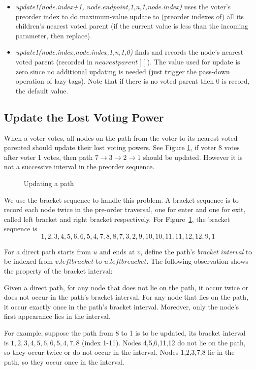 \begin{itemize}
	\item {\em update1(node.index+1, node.endpoint,1,n,1,node.index)} uses the voter's preorder index to do maximum-value update to (preorder indexes of) all its children's nearest voted parent (if the current value is less than the incoming parameter, then replace). 
	\item {\em update1(node.index,node.index,1,n,1,0)} finds and records the node's nearest voted parent (recorded in $nearestparent[]$). The value used for update is zero since no additional updating is needed (just trigger the pass-down operation of lazy-tags). Note that if there is no voted parent then 0 is record, the default value. 
\end{itemize}

\subsection{Update the Lost Voting Power}
\label{sec:step3}
When a voter votes, all nodes on the path from the voter to its nearest voted parented should update their lost voting powers. See Figure \ref{fig:2}, if voter 8 votes after voter 1 votes, then path $7\rightarrow3\rightarrow2\rightarrow1$ should be updated. However it is not a successive interval in the preorder sequence.
\begin{figure}
  \centering
  
	\caption{Updating a path}
	\label{fig:2}
\end{figure}

We use the bracket sequence to handle this problem. A bracket sequence is to
record each node twice in the pre-order traversal, one for enter and one for
exit, called left bracket and right bracket respectively. For Figure~\ref{fig:2}, the bracket sequence is
$$1,2,3,4,5,6,6,5,4,7,8,8,7,3,2,9,10,10,11,11,12,12,9,1$$

For a direct path starts from $u$ and ends at $v$, define the path's {\em bracket interval} to be indexed from $v.leftbracket$ to $u.leftbreacket$. The following observation shows the property of the bracket interval:
\begin{observation}
Given a direct path, for any node that does not lie on the path, it occur twice or does not occur in the path's bracket interval. For any node that lies on the path, it occur exactly once in the path's bracket interval. Moreover, only the node’s first appearance lies in the interval.
\end{observation}
For example, suppose the path from 8 to 1 is to be updated, its bracket interval is $1,2,3,4,5,6,6,5,4,7,8$ (index 1-11). Nodes 4,5,6,11,12 do not lie on the path, so they occur twice or do not occur in the interval. Nodes 1,2,3,7,8 lie in the path, so they occur once in the interval. 

